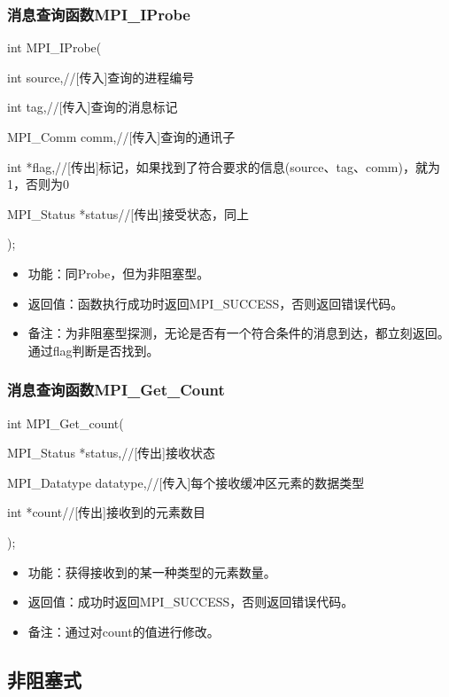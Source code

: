 \documentclass[UTF8]{article}%
\begin{document}
\subsubsection{消息查询函数MPI\_IProbe}

int MPI\_IProbe(

    \qquad int         source,//[传入]查询的进程编号

    \qquad int         tag,//[传入]查询的消息标记

    \qquad MPI\_Comm   comm,//[传入]查询的通讯子

    \qquad int         *flag,//[传出]标记，如果找到了符合要求的信息(source、tag、comm)，就为1，否则为0

    \qquad MPI\_Status *status//[传出]接受状态，同上

);

\begin{itemize}
    \item 功能：同Probe，但为非阻塞型。
    \item 返回值：函数执行成功时返回MPI\_SUCCESS，否则返回错误代码。
    \item 备注：为非阻塞型探测，无论是否有一个符合条件的消息到达，都立刻返回。通过flag判断是否找到。
\end{itemize}

\subsubsection{消息查询函数MPI\_Get\_Count}

int MPI\_Get\_count(

    \qquad MPI\_Status   *status,//[传出]接收状态

    \qquad MPI\_Datatype datatype,//[传入]每个接收缓冲区元素的数据类型

    \qquad int          *count//[传出]接收到的元素数目

);

\begin{itemize}
    \item 功能：获得接收到的某一种类型的元素数量。
    \item 返回值：成功时返回MPI\_SUCCESS，否则返回错误代码。
    \item 备注：通过对count的值进行修改。
\end{itemize}

\subsection{非阻塞式}
\end{document}
